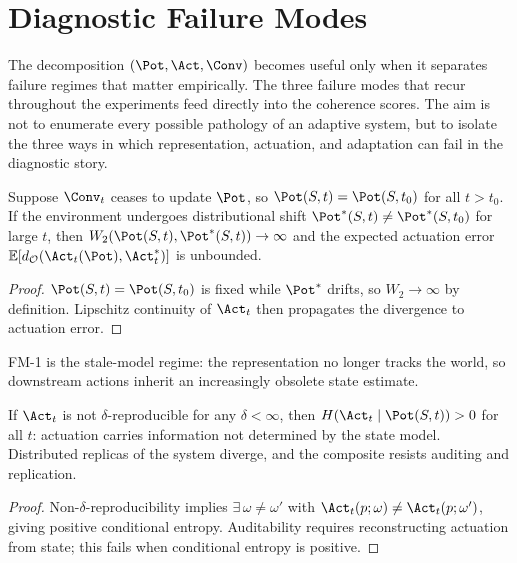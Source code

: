 \section{Diagnostic Failure Modes}\label{sec:failuremodes}\label{sec:examples}

The decomposition $(\Pot,\Act,\Conv)$ becomes useful only when it separates
failure regimes that matter empirically. The three failure modes that recur
throughout the experiments feed directly into the coherence scores. The aim is
not to enumerate every possible pathology of an adaptive system, but to isolate
the three ways in which representation, actuation, and adaptation can fail in
the diagnostic story.

\begin{proposition}\label{prop:failP}
Suppose $\Conv_t$ ceases to update $\Pot$, so $\Pot(S,t)=\Pot(S,t_0)$ for
all $t>t_0$. If the environment undergoes distributional shift
$\Pot^*(S,t)\neq\Pot^*(S,t_0)$ for large $t$, then
$W_2(\Pot(S,t),\Pot^*(S,t))\to\infty$ and the expected actuation error
$\mathbb{E}[d_\mathcal{O}(\Act_t(\Pot),\Act^*_t)]$ is unbounded.
\end{proposition}

\begin{proof}
$\Pot(S,t)=\Pot(S,t_0)$ is fixed while $\Pot^*$ drifts, so $W_2\to\infty$ by
definition. Lipschitz continuity of $\Act_t$ then propagates the divergence to
actuation error.
\end{proof}

\begin{remark}[Interpretation]
FM-1 is the stale-model regime: the representation no longer tracks the world,
so downstream actions inherit an increasingly obsolete state estimate.
\end{remark}

\begin{proposition}\label{prop:failA}
If $\Act_t$ is not $\delta$-reproducible for any $\delta<\infty$, then
$H(\Act_t \mid \Pot(S,t))>0$ for all $t$: actuation carries information not
determined by the state model. Distributed replicas of the system diverge, and
the composite resists auditing and replication.
\end{proposition}

\begin{proof}
Non-$\delta$-reproducibility implies $\exists\,\omega\neq\omega'$ with
$\Act_t(p;\omega)\neq\Act_t(p;\omega')$, giving positive conditional entropy.
Auditability requires reconstructing actuation from state; this fails when
conditional entropy is positive.
\end{proof}

